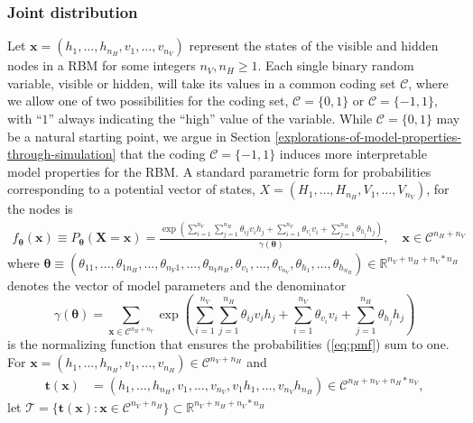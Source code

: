 \documentclass[12pt]{article}
\theoremstyle{definition}
\newcommand{\nv}{{n_{\scriptscriptstyle V}}}
\newcommand{\nh}{{n_{\scriptscriptstyle H}}}
\begin{document}
\subsubsection{Joint distribution}\label{joint-distribution}

Let \(\boldsymbol x = (h_1, \dots, h_\nh, v_1,\dots,v_\nv)\) represent
the states of the visible and hidden nodes in a RBM for some integers
\(\nv, \nh \ge 1\). Each single binary random variable, visible or
hidden, will take its values in a common coding set \(\mathcal{C}\),
where we allow one of two possibilities for the coding set,
\(\mathcal{C}=\{0,1\}\) or \(\mathcal{C}=\{-1,1\}\), with ``\(1\)''
always indicating the ``high'' value of the variable. While
\(\mathcal{C}=\{0,1\}\) may be a natural starting point, we argue in
Section \ref{explorations-of-model-properties-through-simulation} that
the coding \(\mathcal{C}=\{-1,1\}\) induces more interpretable model
properties for the RBM. A standard parametric form for probabilities
corresponding to a potential vector of states,
\(X = (H_1, \dots, H_\nh, V_1,\dots,V_\nv)\), for the nodes is
\begin{align}
\label{eq:pmf}
f_{\boldsymbol \theta} (\boldsymbol x)\equiv P_{\boldsymbol \theta}(\boldsymbol X = \boldsymbol x) = \frac{\exp\left(\sum\limits_{i = 1}^\nv \sum\limits_{j=1}^\nh \theta_{ij} v_i h_j + \sum\limits_{i = 1}^\nv\theta_{v_i} v_i + \sum\limits_{j = 1}^\nh\theta_{h_j} h_j\right)}{\gamma(\boldsymbol \theta)}, \quad \boldsymbol x \in \mathcal{C}^{\nh + \nv} 
\end{align}
where
\(\boldsymbol \theta \equiv (\theta_{11}, \dots, \theta_{1\nh}, \dots, \theta_{\nv 1}, \dots, \theta_{\nv \nh}, \theta_{v_1}, \dots, \theta_{v_\nv}, \theta_{h_1}, \dots, \theta_{h_\nh}) \in \mathbb{R}^{\nv + \nh + \nv*\nh}\)
denotes the vector of model parameters and the denominator \[
\gamma(\boldsymbol \theta) = \sum_{\boldsymbol x \in \mathcal{C}^{\nh+\nv}}\exp\left(\sum_{i = 1}^\nv \sum_{j=1}^\nh \theta_{ij} v_i h_j + \sum_{i = 1}^\nv\theta_{v_i} v_i + \sum_{j = 1}^\nh\theta_{h_j} h_j\right)
\] is the normalizing function that ensures the probabilities
(\eqref{eq:pmf}) sum to one. For
\(\boldsymbol x = (h_1, \dots, h_\nh, v_1, \dots, v_\nh) \in \mathcal{C}^{\nv + \nh}\)
and
\begin{align}
\boldsymbol t(\boldsymbol x) &= (h_1, \dots, h_\nh, v_1, \dots, v_\nv, v_1 h_1, \dots, v_\nv h_\nh) \in \mathcal{C}^{\nh + \nv + \nh*\nv}, \label{eq:t}
\end{align}
let
\(\mathcal{T} = \{\boldsymbol t(\boldsymbol x): \boldsymbol x \in \mathcal{C}^{\nv + \nh}\} \subset \mathbb{R}^{\nv + \nh + \nv * \nh}\)
\end{document}

